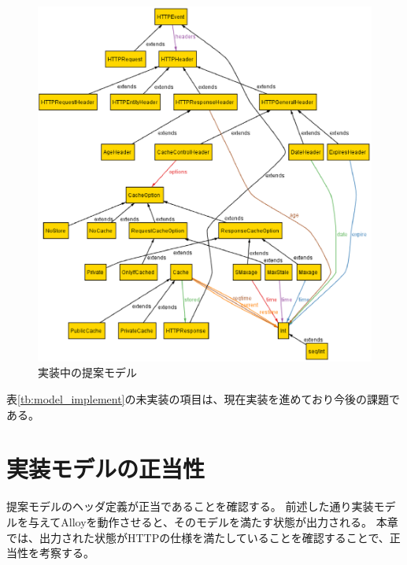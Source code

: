 \documentclass{css}
\begin{document}
\begin{figure}[htb]
\centering
\includegraphics[width=1.0\hsize]{model_alloy.eps}
\caption{実装中の提案モデル}
\label{fig:model_alloy}
\end{figure}



\color{red}
表\ref{tb:model_implement}の未実装の項目は、現在実装を進めており今後の課題である。
\color{black}

\section{実装モデルの正当性}
提案モデルのヘッダ定義が正当であることを確認する。
前述した通り実装モデルを与えてAlloyを動作させると、そのモデルを満たす状態が出力される。
本章では、出力された状態がHTTPの仕様を満たしていることを確認することで、正当性を考察する。
\end{document}
